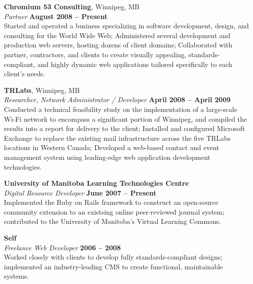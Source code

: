 \documentclass[margin,line,letterpaper]{resume}
\begin{document}
\begin{resume}
  {\bf Chromium 53 Consulting}, Winnipeg, MB \vspace{2mm}\\\vspace{1mm}%
  {\sl Partner} \hfill {\bf August 2008 -- Present}\\
  Started and operated a business specializing in software development, design, and
  consulting for the World Wide Web; Administered several development and production web servers,
  hosting dozens of client domains; Collaborated with partner, contractors, and clients to create
  visually appealing, standards-compliant, and highly dynamic web applications tailored specifically
  to each client's needs.

  {\bf TRLabs}, Winnipeg, MB \vspace{2mm}\\\vspace{1mm}%
  {\sl Researcher, Network Administrator / Developer} \hfill {\bf April 2008 -- April 2009}\\
  Conducted a technical feasibility study on the implementation of a large-scale Wi-Fi
  network to encompass a significant portion of Winnipeg, and compiled the results into a report
  for delivery to the client; Installed and configured Microsoft Exchange to replace the
  existing mail infrastructure across the five TRLabs locations in Western Canada;
  Developed a web-based contact and event management system using leading-edge web application 
  development technologies.

  {\bf University of Manitoba Learning Technologies Centre} \vspace{2mm}\\\vspace{1mm}%
  {\sl Digital Resource Developer} \hfill {\bf June 2007 -- Present}\\
  Implemented the Ruby on Rails framework to construct an open-source
  community extension to an existsing online peer-reviewed journal system; contributed to the
  University of Manitoba's Virtual Learning Commons.

  {\bf Self} \vspace{2mm}\\\vspace{1mm}%
  {\sl Freelance Web Developer} \hfill {\bf 2006 -- 2008}\\
  Worked closely with clients to develop fully standards-compliant designs; implemented
  an industry-leading CMS to create functional, maintainable systems.


\end{resume}
\end{document}

